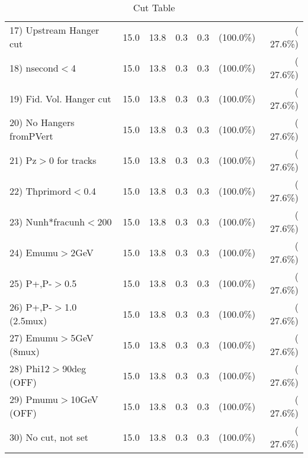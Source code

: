 \begin{table}[h!]
\begin{tabular}{||l||r|r|r|r|r|r||}
 17) Upstream Hanger cut  &         15.0 &         13.8 &          0.3 &          0.3 & (100.0\%) & ( 27.6\%) \\
 18) nsecond$<$4          &         15.0 &         13.8 &          0.3 &          0.3 & (100.0\%) & ( 27.6\%) \\
 19) Fid. Vol. Hanger cut &         15.0 &         13.8 &          0.3 &          0.3 & (100.0\%) & ( 27.6\%) \\
 20) No Hangers fromPVert &         15.0 &         13.8 &          0.3 &          0.3 & (100.0\%) & ( 27.6\%) \\
 21) Pz$>$0 for tracks    &         15.0 &         13.8 &          0.3 &          0.3 & (100.0\%) & ( 27.6\%) \\
 22) Thprimord$<$0.4      &         15.0 &         13.8 &          0.3 &          0.3 & (100.0\%) & ( 27.6\%) \\
 23) Nunh*fracunh$<$200   &         15.0 &         13.8 &          0.3 &          0.3 & (100.0\%) & ( 27.6\%) \\
 24) Emumu$>$2GeV         &         15.0 &         13.8 &          0.3 &          0.3 & (100.0\%) & ( 27.6\%) \\
 25) P+,P-$>$0.5          &         15.0 &         13.8 &          0.3 &          0.3 & (100.0\%) & ( 27.6\%) \\
 26) P+,P-$>$1.0 (2.5mux) &         15.0 &         13.8 &          0.3 &          0.3 & (100.0\%) & ( 27.6\%) \\
 27) Emumu$>$5GeV  (8mux) &         15.0 &         13.8 &          0.3 &          0.3 & (100.0\%) & ( 27.6\%) \\
 28) Phi12$>$90deg  (OFF) &         15.0 &         13.8 &          0.3 &          0.3 & (100.0\%) & ( 27.6\%) \\
 29) Pmumu$>$10GeV  (OFF) &         15.0 &         13.8 &          0.3 &          0.3 & (100.0\%) & ( 27.6\%) \\
 30) No cut, not set      &         15.0 &         13.8 &          0.3 &          0.3 & (100.0\%) & ( 27.6\%) \\
 \hline
 \hline
 \end{tabular}
 \caption{Cut Table           }
 \label{tab-cutheavy_neutrino_1.000}
 \end{table}

